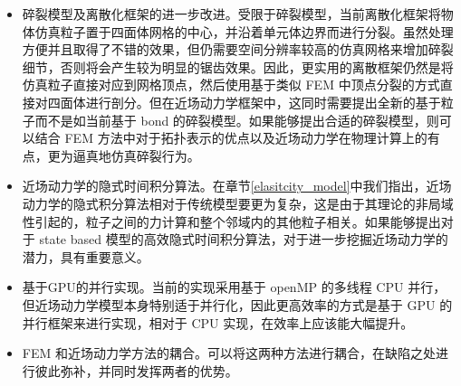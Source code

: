 \begin{itemize}
  \item 碎裂模型及离散化框架的进一步改进。受限于碎裂模型，当前离散化框架将物体仿真粒子置于四面体网格的中心，并沿着单元体边界而进行分裂。虽然处理方便并且取得了不错的效果，但仍需要空间分辨率较高的仿真网格来增加碎裂细节，否则将会产生较为明显的锯齿效果。因此，更实用的离散框架仍然是将仿真粒子直接对应到网格顶点，然后使用基于类似 FEM 中顶点分裂的方式直接对四面体进行剖分。但在近场动力学框架中，这同时需要提出全新的基于粒子而不是如当前基于 bond 的碎裂模型。如果能够提出合适的碎裂模型，则可以结合 FEM 方法中对于拓扑表示的优点以及近场动力学在物理计算上的有点，更为逼真地仿真碎裂行为。
  \item 近场动力学的隐式时间积分算法。在章节\ref{elasitcity_model}中我们指出，近场动力学的隐式积分算法相对于传统模型要更为复杂，这是由于其理论的非局域性引起的，粒子之间的力计算和整个邻域内的其他粒子相关。如果能够提出对于 state based 模型的高效隐式时间积分算法，对于进一步挖掘近场动力学的潜力，具有重要意义。
  \item 基于GPU的并行实现。当前的实现采用基于 openMP 的多线程 CPU 并行，但近场动力学模型本身特别适于并行化，因此更高效率的方式是基于 GPU 的并行框架来进行实现，相对于 CPU 实现，在效率上应该能大幅提升。
  \item FEM 和近场动力学方法的耦合。可以将这两种方法进行耦合，在缺陷之处进行彼此弥补，并同时发挥两者的优势。
\end{itemize}